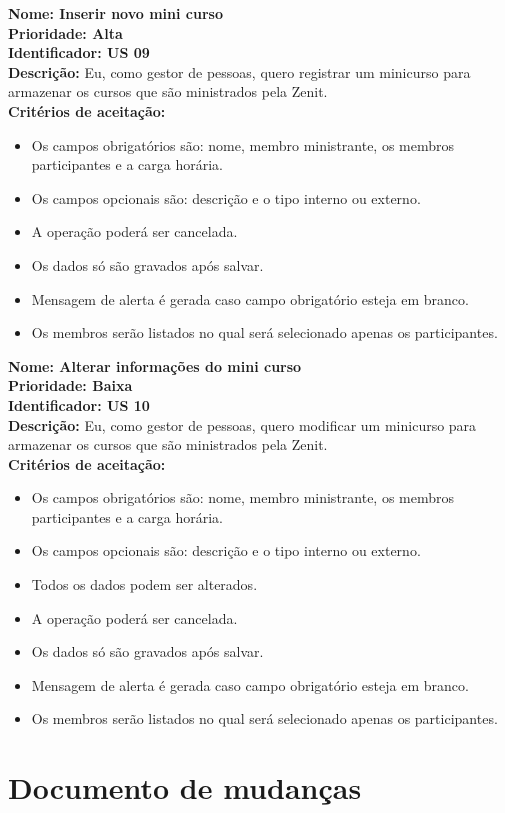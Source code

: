 \begin{anexosenv}
\textbf{Nome: Inserir novo mini curso\\
Prioridade: Alta\\
Identificador: US 09\\
Descrição: }Eu, como gestor de pessoas, quero registrar um minicurso para armazenar os cursos que são ministrados pela Zenit.\\
\textbf{Critérios de aceitação:}
\begin{itemize}
    \item Os campos obrigatórios são: nome, membro ministrante, os membros participantes e a carga horária.
    \item Os campos opcionais são: descrição e o tipo interno ou externo.
    \item A operação poderá ser cancelada.
    \item Os dados só são gravados após salvar.
    \item Mensagem de alerta é gerada caso campo obrigatório esteja em branco.
    \item Os membros serão listados no qual será selecionado apenas os participantes.
\end{itemize}

\textbf{Nome: Alterar informações do mini curso\\
Prioridade: Baixa\\
Identificador: US 10\\
Descrição:} Eu, como gestor de pessoas, quero modificar um minicurso para armazenar os cursos que são ministrados pela Zenit.\\
\textbf{Critérios de aceitação:}
\begin{itemize}
    \item Os campos obrigatórios são: nome, membro ministrante, os membros participantes e a carga horária.
    \item Os campos opcionais são: descrição e o tipo interno ou externo.
    \item Todos os dados podem ser alterados.
    \item A operação poderá ser cancelada.
    \item Os dados só são gravados após salvar.
    \item Mensagem de alerta é gerada caso campo obrigatório esteja em branco.
    \item Os membros serão listados no qual será selecionado apenas os participantes.
\end{itemize}

\chapter[Documento de mudanças]{Documento de mudanças}


\end{anexosenv}
